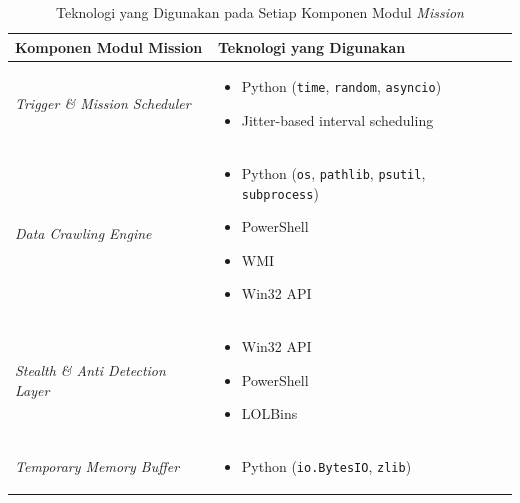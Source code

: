 \begin{table}[H]
\centering
\captionsetup{justification=raggedright,singlelinecheck=false}
\caption{Teknologi yang Digunakan pada Setiap Komponen Modul \textit{Mission}}
\label{tbl:teknologi-mission}

\renewcommand{\arraystretch}{1.4}
\begin{tabular}{|p{5cm}|p{8cm}|}
\hline
\textbf{Komponen Modul Mission} & \textbf{Teknologi yang Digunakan} \\
\hline

\textit{Trigger \& Mission Scheduler} &
\begin{itemize}[leftmargin=1.2em]
    \item Python (\texttt{time}, \texttt{random}, \texttt{asyncio})
    \item Jitter-based interval scheduling
\end{itemize}
\\
\hline

\textit{Data Crawling Engine} &
\begin{itemize}[leftmargin=1.2em]
    \item Python (\texttt{os}, \texttt{pathlib}, \texttt{psutil}, \texttt{subprocess})
    \item PowerShell
    \item WMI
    \item Win32 API
\end{itemize}
\\
\hline

\textit{Stealth \& Anti Detection Layer} &
\begin{itemize}[leftmargin=1.2em]
    \item Win32 API
    \item PowerShell
    \item LOLBins
\end{itemize}
\\
\hline

\textit{Temporary Memory Buffer} &
\begin{itemize}[leftmargin=1.2em]
    \item Python (\texttt{io.BytesIO}, \texttt{zlib})
\end{itemize}
\\
\hline

\end{tabular}
\end{table}

